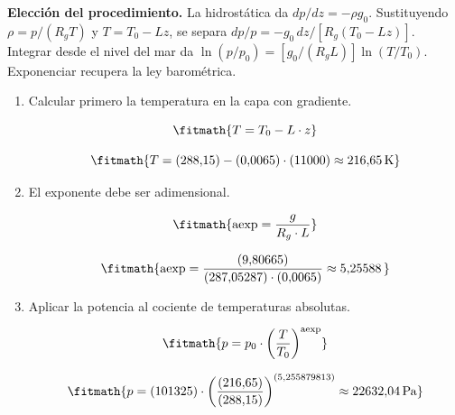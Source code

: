 \noindent\textbf{Elección del procedimiento.} La hidrostática da $dp/dz=-\rho g_0$. Sustituyendo $\rho=p/(R_gT)$ y $T=T_0-Lz$, se separa $dp/p=-g_0\,dz/[R_g(T_0-Lz)]$. Integrar desde el nivel del mar da $\ln(p/p_0)=[g_0/(R_gL)]\ln(T/T_0)$. Exponenciar recupera la ley barométrica.

\begin{enumerate}

\item Calcular primero la temperatura en la capa con gradiente.

\[\fitmath{T=T_{0}-L\cdot z}\]

\[\fitmath{T=(288{,}15)-(0{,}0065)\cdot (11000)\approx 216{,}65\,\mathrm{K}}\]

\item El exponente debe ser adimensional.

\[\fitmath{\mathrm{aexp}=\frac{g}{R_g\cdot L}}\]

\[\fitmath{\mathrm{aexp}=\frac{(9{,}80665)}{(287{,}05287)\cdot (0{,}0065)}\approx 5{,}25588\,}\]

\item Aplicar la potencia al cociente de temperaturas absolutas.

\[\fitmath{p=p_{0}\cdot {\left(\frac{T}{T_{0}}\right)}^{\mathrm{aexp}}}\]

\[\fitmath{p=(101325)\cdot {\left(\frac{(216{,}65)}{(288{,}15)}\right)}^{(5{,}255879813)}\approx 22632{,}04\,\mathrm{Pa}}\]

\end{enumerate}
